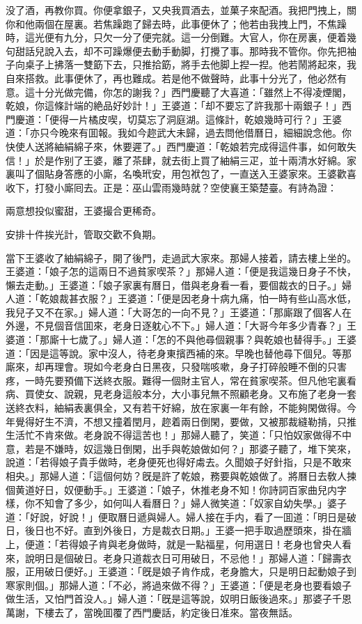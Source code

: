 没了酒，再教你買。你便拿銀子，又央我買酒去，並菓子來配酒。我把門拽上，關你和他兩個在屋裏。若焦躁跑了歸去時，此事便休了；他若由我拽上門，不焦躁時，這光便有九分，只欠一分了便完就。這一分倒難。大官人，你在房裏，便着幾句甜話兒說入去，却不可躁爆便去動手動脚，打攪了事。那時我不管你。你先把袖子向桌子上拂落一雙筯下去，只推拾筯，將手去他脚上揑一揑。他若鬧將起來，我自來搭救。此事便休了，再也難成。若是他不做聲時，此事十分光了，他必然有意。這十分光做完備，你怎的謝我？」西門慶聽了大喜道：「雖然上不得凌煙閣，乾娘，你這條計端的絶品好妙計！」王婆道：「却不要忘了許我那十兩銀子！」西門慶道：「便得一片橘皮喫，切莫忘了洞庭湖。這條計，乾娘幾時可行？」王婆道：「亦只今晚來有囬報。我如今趂武大未歸，過去問他借曆日，細細說念他。你快使人送將紬絹綿子來，休要遲了。」西門慶道：「乾娘若完成得這件事，如何敢失信！」於是作别了王婆，離了茶肆，就去街上買了紬絹三疋，並十兩清水好綿。家裏叫了個貼身答應的小廝，名喚玳安，用包袱包了，一直送入王婆家來。王婆歡喜收下，打發小廝囘去。正是：巫山雲雨幾時就？空使襄王築楚臺。有詩為證：

兩意想投似蜜甜，王婆撮合更稀奇。

安排十件挨光計，管取交歡不負期。

當下王婆收了紬絹綿子，開了後門，走過武大家來。那婦人接着，請去樓上坐的。王婆道：「娘子怎的這兩日不過貧家喫茶？」那婦人道：「便是我這幾日身子不快，懶去走動。」王婆道：「娘子家裏有曆日，借與老身看一看，要個裁衣的日子。」婦人道：「乾娘裁甚衣服？」王婆道：「便是因老身十病九痛，怕一時有些山高水低，我兒子又不在家。」婦人道：「大哥怎的一向不見？」王婆道：「那廝跟了個客人在外邊，不見個音信囬來，老身日逐躭心不下。」婦人道：「大哥今年多少青春？」王婆道：「那廝十七歲了。」婦人道：「怎的不與他尋個親事？與乾娘也替得手。」王婆道：「因是這等說。家中沒人，待老身東擯西補的來。早晚也替他尋下個兒。等那廝來，却再理會。現如今老身白日黑夜，只發喘咳嗽，身子打碎般睡不倒的只害疼，一時先要預備下送終衣服。難得一個財主官人，常在貧家喫茶。但凡他宅裏看病、買使女、說親，見老身這般本分，大小事兒無不照顧老身。又布施了老身一套送終衣料，紬絹表裏俱全，又有若干好綿，放在家裏一年有餘，不能夠閑做得。今年覺得好生不濟，不想又撞着閏月，趂着兩日倒閑，要做，又被那裁縫勒掯，只推生活忙不肯來做。老身說不得這苦也！」那婦人聽了，笑道：「只怕奴家做得不中意，若是不嫌時，奴這幾日倒閑，出手與乾娘做如何？」那婆子聽了，堆下笑來，說道：「若得娘子貴手做時，老身便死也得好䖏去。久聞娘子好針指，只是不敢來相央。」那婦人道：「這個何妨？旣是許了乾娘，務要與乾娘做了。將曆日去敎人揀個黄道好日，奴便動手。」王婆道：「娘子，休推老身不知！你詩詞百家曲兒内字樣，你不知會了多少，如何叫人看曆日？」婦人微笑道：「奴家自幼失學。」婆子道：「好說，好說！」便取曆日遞與婦人。婦人接在手内，看了一囬道：「明日是破日，後日也不好。直到外後日，方是裁衣日期。」王婆一把手取過歷頭來，掛在牆上，便道：「若得娘子肯與老身做時，就是一點福星，何用選日！老身也曾央人看來，說明日是個破日。老身只道裁衣日可用破日，不忌他！」那婦人道：「歸壽衣服，正用破日便好。」王婆道：「旣是娘子肯作成，老身膽大，只是明日起動娘子到寒家則個。」那婦人道：「不必，將過來做不得？」王婆道：「便是老身也要看娘子做生活，又怕門首没人。」婦人道：「旣是這等說，奴明日飯後過來。」那婆子千恩萬謝，下樓去了，當晚囬覆了西門慶話，約定後日准來。當夜無話。

